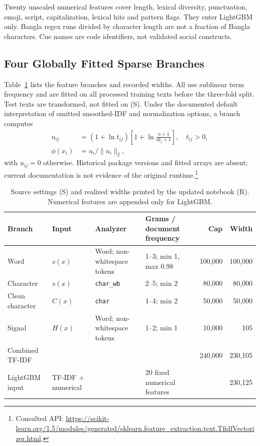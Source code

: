 \documentclass[doublecolumn]{ijcvsplatex}
\begin{document}
Twenty unscaled numerical features cover length, lexical diversity, punctuation, emoji, script, capitalization, lexical hits and pattern flags. They enter LightGBM only. Bangla regex runs divided by character length are not a fraction of Bangla characters. Cue names are code identifiers, not validated social constructs.

\subsection{Four Globally Fitted Sparse Branches}
Table~\ref{tab:features} lists the feature branches and recorded widths. All use sublinear term frequency and are fitted on all processed training texts before the three-fold split. Test texts are transformed, not fitted on (S). Under the documented default interpretation of omitted smoothed-IDF and normalization options, a branch computes
\begin{equation}
\begin{aligned}
u_{ij}&=(1+\ln t_{ij})\left[1+\ln\frac{n+1}{\mathrm{df}_j+1}\right],\quad t_{ij}>0,\\
\phi(x_i)&=u_i/\|u_i\|_2,
\end{aligned}
\end{equation}
with $u_{ij}=0$ otherwise. Historical package versions and fitted arrays are absent; current documentation is not evidence of the original runtime.\footnote{Consulted API: \url{https://scikit-learn.org/1.5/modules/generated/sklearn.feature_extraction.text.TfidfVectorizer.html}.}

\begin{table}[t]
\small\centering
\caption{Source settings (S) and realized widths printed by the updated notebook (R). Numerical features are appended only for LightGBM.}
\label{tab:features}
\setlength{\tabcolsep}{4pt}
\begin{tabular}{llllrr}
\toprule
Branch & Input & Analyzer & Grams / document frequency & Cap & Width \\
\midrule
Word & $s(x)$ & Word; non-whitespace tokens & 1--3; min 1, max 0.98 & 100,000 & 100,000 \\
Character & $s(x)$ & \texttt{char\_wb} & 2--5; min 2 & 80,000 & 80,000 \\
Clean character & $C(x)$ & \texttt{char} & 1--4; min 2 & 50,000 & 50,000 \\
Signal & $H(x)$ & Word; non-whitespace tokens & 1--2; min 1 & 10,000 & 105 \\
\midrule
Combined TF-IDF & & & & 240,000 & 230,105 \\
LightGBM input & TF-IDF + numerical & & 20 fixed numerical features & & 230,125 \\
\bottomrule
\end{tabular}
\end{table}
\end{document}
